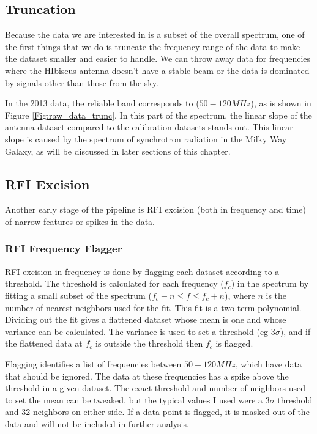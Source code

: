 \subsection{Truncation}

Because the data we are interested in is a subset of the overall spectrum, one of the first things that we do is truncate the frequency range of the data to make the dataset smaller and easier to handle. We can throw away data for frequencies where the HIbiscus antenna doesn't have a stable beam or the data is dominated by signals other than those from the sky. 

In the 2013 data, the reliable band corresponds to ($50-120 MHz$), as is shown in Figure \ref{Fig:raw_data_trunc}. In this part of the spectrum, the linear slope of the antenna dataset compared to the calibration datasets stands out. This linear slope is caused by the spectrum of synchrotron radiation in the Milky Way Galaxy, as will be discussed in later sections of this chapter. 


\subsection{RFI Excision}

Another early stage of the pipeline is RFI excision (both in frequency and time) of narrow features or spikes in the data. 

\subsubsection{RFI Frequency Flagger}

RFI excision in frequency is done by flagging each dataset according to a threshold. The threshold is calculated for each frequency ($f_c$) in the spectrum by fitting a small subset of the spectrum ($f_c-n \leq f \leq f_c + n$), where $n$ is the number of nearest neighbors used for the fit. This fit is a two term polynomial. Dividing out the fit gives a flattened dataset whose mean is one and whose variance can be calculated. The variance is used to set a threshold (eg $3 \sigma$), and if the flattened data at $f_c$ is outside the threshold then $f_c$ is flagged. 

Flagging identifies a list of frequencies between $50-120 MHz$, which have data that should be ignored. The data at these frequencies has a spike above the threshold in a given dataset. The exact threshold and number of neighbors used to set the mean can be tweaked, but the typical values I used were a 3$\sigma$ threshold and 32 neighbors on either side. If a data point is flagged, it is masked out of the data and will not be included in further analysis.  

